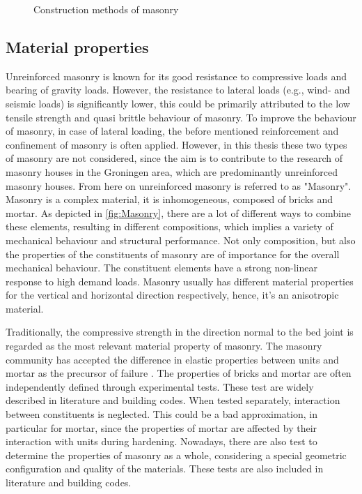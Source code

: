 \begin{figure}[!htb]
    \centering
     \hfill
    \hfill
    \caption{Construction methods of masonry \cite{barraza2012numerical}}
    \label{fig:MasonryCons}
\end{figure}


\subsection{Material properties}
\label{subsec:properties}
Unreinforced masonry is known for its good resistance to compressive loads and bearing of gravity loads. However, the resistance to lateral loads (e.g., wind- and seismic loads) is significantly lower, this could be primarily attributed to the low tensile strength and quasi brittle behaviour of masonry. To improve the behaviour of masonry, in case of lateral loading, the before mentioned reinforcement and confinement of masonry is often applied. However, in this thesis these two types of masonry are not considered, since the aim is to contribute to the research of masonry houses in the Groningen area, which are predominantly unreinforced masonry houses. From here on unreinforced masonry is referred to as "Masonry".\\

Masonry is a complex material, it is inhomogeneous, composed of bricks and mortar. As depicted in \autoref{fig:Masonry}, there are a lot of different ways to combine these elements, resulting in different compositions, which implies a variety of mechanical behaviour and structural performance. Not only composition, but also the properties of the constituents of masonry are of importance for the overall mechanical behaviour. The constituent elements have a strong non-linear response to high demand loads. Masonry usually has different material properties for the vertical and horizontal direction respectively, hence, it's an anisotropic material.

Traditionally, the compressive strength in the direction normal to the bed joint is regarded as the most relevant material property of masonry. The masonry community has accepted the difference in elastic properties between units and mortar as the precursor of failure \cite{angelillo2014mechanics}. The properties of bricks and mortar are often independently defined through experimental tests. These test are widely described in literature and building codes. When tested separately, interaction between constituents is neglected. This could be a bad approximation, in particular for mortar, since the properties of mortar are affected by their interaction with units during hardening. Nowadays, there are also test to determine the properties of masonry as a whole, considering a special geometric configuration and quality of the materials. These tests are also included in literature and building codes.


